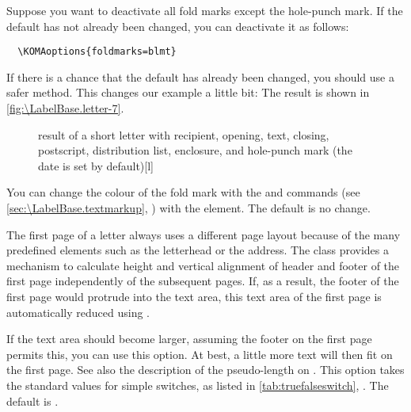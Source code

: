 %
\begin{Example}
  Suppose you want to deactivate all fold marks except the hole-punch mark. If
  the default has not already been changed, you can deactivate it as follows:
\begin{lstlisting}
  \KOMAoptions{foldmarks=blmt}
\end{lstlisting}
  If there is a chance that the default has already been changed, you should
  use a safer method. This changes our example a little bit:
  The result is shown in \autoref{fig:\LabelBase.letter-7}.
  \begin{figure}
    \setcapindent{0pt}%
    \begin{captionbeside}{%
        result of a short letter with recipient, opening, text, closing,
        postscript, distribution list, enclosure, and hole-punch mark
        (the date is set by default)}[l]
    \end{captionbeside}
    \label{fig:\LabelBase.letter-7}
  \end{figure}
\end{Example}
%
You can change the colour of the fold mark
with the  and
 commands (see
\autoref{sec:\LabelBase.textmarkup}, )
with the  element. The default is no change.%
\EndIndexGroup


\begin{Declaration}
\end{Declaration}
\begin{Explain}
  The first page of a letter always uses a different page layout because of
  the many predefined elements such as the letterhead or the address. The
   class provides a mechanism to calculate height and vertical
  alignment of header and footer of the first page independently of the
  subsequent pages. If, as a result, the footer of the first page would
  protrude into the text area, this text area of the first page is
  automatically reduced using
  .
\end{Explain}
If the text area should become larger, assuming the footer on the first page
permits this, you can use this option. At best, a little more text will then
fit on the first page. See also the description of the 
pseudo-length on .  This
option takes the standard values for simple switches, as listed in
\autoref{tab:truefalseswitch}, . The default
is .%
\EndIndexGroup


